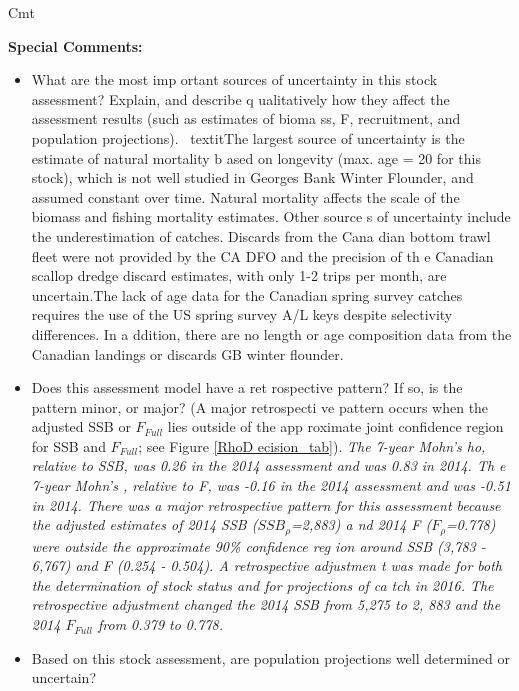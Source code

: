 Cmt{ \textbf{Special Comments: } \begin{itemize}{} \item{}What are the most imp
ortant sources of uncertainty in this stock assessment? Explain, and describe q
ualitatively how they affect the assessment results (such as estimates of bioma
ss, F, recruitment, and population projections). \linebreak{} \hspace*{0.5cm} \
textit{The largest source of uncertainty is the estimate of natural mortality b
ased on longevity (max. age = 20 for this stock), which is not well studied in 
Georges Bank Winter Flounder, and assumed constant over time. Natural mortality
 affects the scale of the biomass and fishing mortality estimates. Other source
s of uncertainty include the underestimation of catches. Discards from the Cana
dian bottom trawl fleet were not provided by the CA DFO and the precision of th
e Canadian scallop dredge discard estimates, with only 1-2 trips per month, are
 uncertain.The lack of age data for the Canadian spring survey catches requires
 the use of the US spring survey A/L keys despite selectivity differences. In a
ddition, there are no length or age composition data from the Canadian landings
 or discards GB winter flounder.} \item{} Does this assessment model have a ret
rospective pattern? If so, is the pattern minor, or major? (A major retrospecti
ve pattern occurs when the adjusted SSB or $F_{Full}${} lies outside of the app
roximate joint confidence region for SSB and $F_{Full}${}; see Figure \ref{RhoD
ecision_tab}{}). \linebreak{} \hspace*{0.5cm} \textit{ The 7-year Mohn's , relative to SSB, was 0.26 in the 2014 assessment and was 0.83 in 2014. Th
e 7-year Mohn's \textrho{}, relative to F, was -0.16 in the 2014 assessment and
 was -0.51 in 2014. There was a major retrospective pattern for this assessment
 because the \textrho{} adjusted estimates of 2014 SSB ($SSB_{\rho}${}=2,883) a
nd 2014 F ($F_{\rho}${}=0.778) were outside the approximate 90\% confidence reg
ion around SSB (3,783 - 6,767) and F (0.254 - 0.504). A retrospective adjustmen
t was made for both the determination of stock status and for projections of ca
tch in 2016. The retrospective adjustment changed the 2014 SSB from 5,275 to 2,
883 and the 2014 $F_{Full}${} from 0.379 to 0.778.} \item{}Based on this stock 
assessment, are population projections well determined or uncertain? \linebreak

\end{itemize}}
